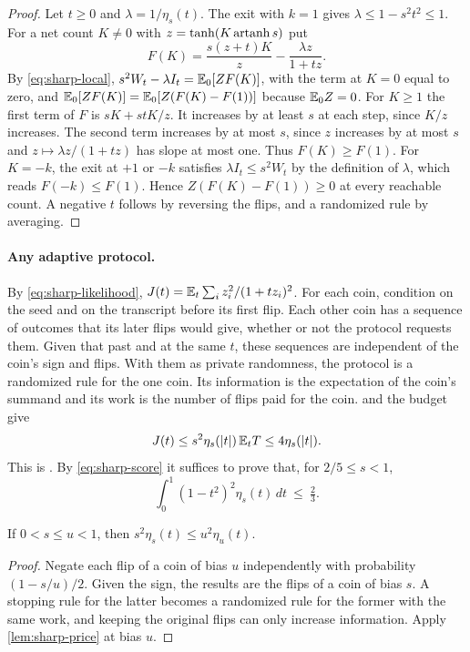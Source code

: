 \begin{proof}
Let $t\ge0$ and $\lambda=1/\eta_s(t)$. The exit with $k=1$ gives
$\lambda\le1-s^2t^2\le1$.
For a net count $K\ne0$ with $z=\tanh(K\operatorname{artanh} s)$ put
\[
 F(K)=\frac{s(z+t)K}{z}-\frac{\lambda z}{1+tz}.
\]
By \eqref{eq:sharp-local}, $s^2W_t-\lambda I_t=\mathbb E_0[ZF(K)]$, with the term at
$K=0$ equal to zero, and $\mathbb E_0[ZF(K)]=\mathbb E_0[Z(F(K)-F(1))]$ because
$\mathbb E_0Z=0$. For $K\ge1$ the first term of $F$ is $sK+stK/z$. It increases
by at least $s$ at each step, since $K/z$ increases. The second term
increases by at most $s$, since $z$ increases by at most $s$ and
$z\mapsto\lambda z/(1+tz)$ has slope at most one. Thus $F(K)\ge F(1)$. For
$K=-k$, the exit at $+1$ or $-k$ satisfies $\lambda I_t\le s^2W_t$ by the
definition of $\lambda$, which reads $F(-k)\le F(1)$. Hence
$Z(F(K)-F(1))\ge0$
at every reachable count. A negative $t$ follows by reversing the flips,
and a randomized rule by averaging.
\end{proof}

\paragraph{Any adaptive protocol.}
By \eqref{eq:sharp-likelihood}, $J(t)=\mathbb E_t\sum_iz_i^2/(1+tz_i)^2$. For each
coin, condition on the seed and on the transcript before its first flip.
Each other coin has a sequence of outcomes that its later flips would
give, whether or not the protocol requests them. Given that past and at
the same $t$, these sequences are independent of the coin's sign and
flips. With them as private randomness, the protocol is a randomized rule
for the one coin. Its information is the expectation of the coin's
summand and its work is the number of flips paid for the coin.
 and the budget give
\[
 J(t)\le s^2\eta_s(|t|)\,\mathbb E_tT\le4\eta_s(|t|).
\]
This is . By
\eqref{eq:sharp-score} it suffices to prove that, for $2/5\le s<1$,
\begin{equation}\label{eq:sharp-window}
 \int_0^1(1-t^2)^2\eta_s(t)\,dt\ \le\ \tfrac23 .
\end{equation}

\begin{lemma}\label{lem:sharp-scale}
If $0<s\le u<1$, then $s^2\eta_s(t)\le u^2\eta_u(t)$.
\end{lemma}

\begin{proof}
Negate each flip of a coin of bias $u$ independently with probability
$(1-s/u)/2$. Given the sign, the results are the flips of a coin of bias
$s$. A stopping rule for the latter becomes a randomized rule for the
former with the same work, and keeping the original flips can only
increase information. Apply \cref{lem:sharp-price} at bias $u$.
\end{proof}

